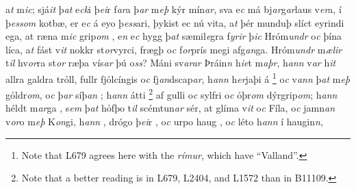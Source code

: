 a\textit{t}  m\textit{ic}; sjá\textit{it} þ\textit{at} e\textit{ck}i   þ\textit{ei}r f\textit{ar}a þ\textit{ar} m\textit{eþ} kýr mín\textit{ar},
sva e\textit{c} má bj\textit{ar}g\textit{ar}laus   v\textit{er}a,  í þ\textit{ess}\textit{om} kotbæ, er
e\textit{c}  á eyo þ\textit{ess}ari, þykist ec  nú vita, a\textit{t} þér
munduþ   slíct eyrindi ega, at  ræna m\textit{ic} grip\textit{om} , e\textit{n} e\textit{c}  hygg   þ\textit{at}  sæmil\textit{e}gra   f\textit{yrir} þ\textit{ic} Hróm\textit{undr} o\textit{c} þína líca, a\textit{t} fást
v\textit{it} nokkr   st\textit{or}vyrci,   
frægþ o\textit{c}  f\textit{or}prís megi   afg\textit{an}ga. 
Hróm\textit{undr} m\textit{ælir} t\textit{il} hv\textit{or}ra st\textit{or} ræþa   vís\textit{ar}  þú o\textit{ss}? 
Máni sv\textit{arar} Þráin\textit{n} h\textit{ie}t m\textit{aþr}, h\textit{ann} v\textit{ar} h\textit{it} allra  galdra trỏll, fullr fjỏlcíngis o\textit{c} fj\textit{an}dscap\textit{ar}, h\textit{ann}  h\textit{er}jaþi   á  \footnote{Note that L679 agrees here with the \textit{rímur}, which have \enquote{Valland}.}  o\textit{c} v\textit{an}\textit{n} þ\textit{at} m\textit{eþ}
gỏldr\textit{om}, o\textit{c}   þ\textit{ar} síþ\textit{an} ; 
h\textit{ann} átti  \footnote{
	Note that a better reading is in L679, L2404, and L1572 than in B11109.} af gulli o\textit{c} sylfri o\textit{c} ỏþr\textit{om}
dýrgrip\textit{om}; h\textit{ann} héldt  m\textit{ar}ga  , s\textit{em} þ\textit{at} hỏfþo t\textit{il} scémtun\textit{ar} sér, at
glíma v\textit{it}  o\textit{c} Fíla, o\textit{c}  jamn\textit{an}  v\textit{or}o   m\textit{eþ} K\textit{on}gi,   h\textit{ann} , drógo þ\textit{ei}r  , o\textit{c} urpo haug ,  o\textit{c} léto h\textit{ann} í haugin\textit{n},
